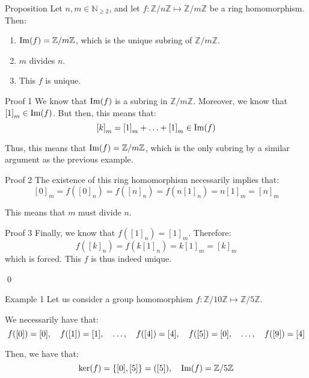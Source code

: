 \documentclass[a4paper]{article}
\begin{document}
\begin{parag}{Proposition}
    Let $n, m \in \mathbb{N}_{\geq 2}$, and let $f: \mathbb{Z}/n\mathbb{Z} \mapsto \mathbb{Z}/m\mathbb{Z}$ be a ring homomorphism. Then:
    \begin{enumerate}
        \item $\im\left(f\right) = \mathbb{Z}/m\mathbb{Z}$, which is the unique subring of $\mathbb{Z}/m\mathbb{Z}$.
        \item $m$ divides $n$.
        \item This $f$ is unique.
    \end{enumerate}

    \begin{subparag}{Proof 1}
        We know that $\im\left(f\right)$ is a subring in $\mathbb{Z}/m\mathbb{Z}$. Moreover, we know that $\left[1\right]_m \in \im\left(f\right)$. But then, this means that: 
        \[\left[k\right]_m = \left[1\right]_m + \ldots + \left[1\right]_m \in \im\left(f\right)\]
        
        Thus, this means that $\im\left(f\right) = \mathbb{Z}/m\mathbb{Z}$, which is the only subring by a similar argument as the previous example.
    \end{subparag}
    
    \begin{subparag}{Proof 2}
        The existence of this ring homomorphism necessarily implies that: 
        \[\left[0\right]_m = f\left(\left[0\right]_n\right) = f\left(\left[n\right]_n\right) = f\left(n \left[1\right]_n\right) = n\left[1\right]_m = \left[n\right]_m \]
        
        This means that $m$ must divide $n$.
    \end{subparag}

    \begin{subparag}{Proof 3}
        Finally, we know that $f\left(\left[1\right]_n\right) = \left[1\right]_m$. Therefore:
        \[f\left(\left[k\right]_n\right) = f\left(k\left[1\right]_n\right) = k\left[1\right]_m = \left[k\right]_m\]
        which is forced. This $f$ is thus indeed unique.

        \qed
    \end{subparag}
\end{parag}

\begin{parag}{Example 1}
    Let us consider a group homomorphism $f: \mathbb{Z}/10\mathbb{Z} \mapsto \mathbb{Z}/5\mathbb{Z}$.

    We necessarily have that: 
    \[f\left(\left[0\right]\right) = \left[0\right], \mathspace f\left(\left[1\right]\right) = \left[1\right], \mathspace \ldots, \mathspace f\left(\left[4\right]\right) = \left[4\right], \mathspace f\left(\left[5\right]\right) = \left[0\right], \mathspace \ldots, \mathspace f\left(\left[9\right]\right) = \left[4\right]\]
    
    Then, we have that: 
    \[\ker\left(f\right) = \left\{\left[0\right], \left[5\right]\right\} = \left(\left[5\right]\right), \mathspace \im\left(f\right) = \mathbb{Z}/5\mathbb{Z}\]
\end{parag}
\end{document}
